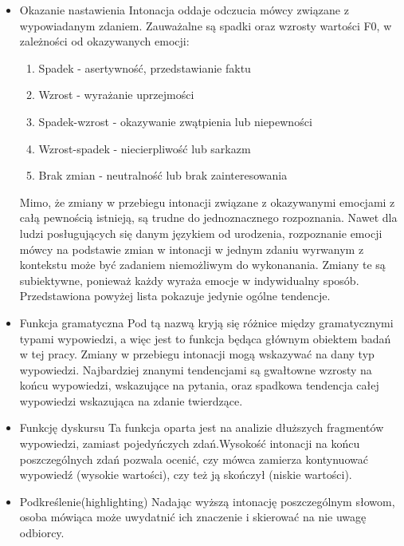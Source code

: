 \documentclass[a4paper,12 pt]{report}
\begin{document}
\begin{itemize}
\item{Okazanie nastawienia} 
\leavevmode
\newline
Intonacja oddaje odczucia mówcy związane z wypowiadanym zdaniem. Zauważalne są spadki oraz wzrosty wartości F0, w zależności od okazywanych emocji:
\begin{enumerate}
\item{Spadek - asertywność, przedstawianie faktu}
\item{Wzrost - wyrażanie uprzejmości}
\item{Spadek-wzrost - okazywanie zwątpienia lub niepewności}
\item{Wzrost-spadek - niecierpliwość lub sarkazm}
\item{Brak zmian - neutralność lub brak zainteresowania}
\end{enumerate}
Mimo, że zmiany w przebiegu intonacji związane z okazywanymi emocjami z całą pewnością istnieją, są trudne do jednoznacznego rozpoznania. Nawet dla ludzi posługujących się danym językiem od urodzenia, rozpoznanie emocji mówcy na podstawie zmian w intonacji w jednym zdaniu wyrwanym z kontekstu może być zadaniem niemożliwym do wykonanania. Zmiany te są subiektywne, ponieważ każdy wyraża emocje w indywidualny sposób. Przedstawiona powyżej lista pokazuje jedynie ogólne tendencje.
\item{Funkcja gramatyczna}
\leavevmode
\newline
Pod tą nazwą kryją się różnice między gramatycznymi typami wypowiedzi, a więc jest to funkcja będąca głównym obiektem badań w tej pracy. Zmiany w przebiegu intonacji mogą wskazywać na dany typ wypowiedzi. Najbardziej znanymi tendencjami są gwałtowne wzrosty na końcu wypowiedzi, wskazujące na pytania, oraz spadkowa tendencja całej wypowiedzi wskazująca na zdanie twierdzące.
\item{Funkcję dyskursu} 
\leavevmode
\newline
Ta funkcja oparta jest na analizie dłuższych fragmentów wypowiedzi, zamiast pojedyńczych zdań.Wysokość intonacji na końcu poszczególnych zdań pozwala ocenić, czy mówca zamierza kontynuować wypowiedź (wysokie wartości), czy też ją skończył (niskie wartości).

\item{Podkreślenie(highlighting)}
\leavevmode
\newline
Nadając wyższą intonację poszczególnym słowom, osoba mówiąca może uwydatnić ich znaczenie i skierować na nie uwagę odbiorcy.
\end{itemize}
\end{document}
